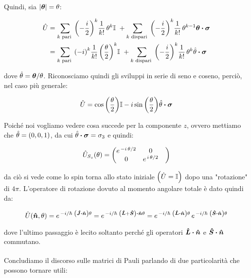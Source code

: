 	Quindi, sia $|\vb*{\theta}| = \theta$:
	
\begin{align*}
	\hat{U} & = \sum_{ k \text{ pari }} \qty(- \frac{i}{2})^k \frac{1}{k!} \, \theta^k \mathbb{I} \,\, + \sum_{k \text{ dispari }} \qty(- \frac{i}{2})^k \frac{1}{k!} \, \theta^{k-1} \vb*{\theta} \vdot \vb*{\sigma} \\
	& = \sum_{ k \text{ pari }} \qty(-i)^k  \frac{1}{k!} \, \qty(\frac{\theta}{2})^k \mathbb{I} \,\, + \sum_{k \text{ dispari }} \qty(- \frac{i}{2})^k \frac{1}{k!} \, \theta^{k} \hat{\theta} \vdot \vb*{\sigma}
\end{align*}
	
	dove $\hat{\theta} = \vb*{\theta}/\theta$. Riconosciamo quindi gli sviluppi in serie di seno e coseno, perciò, nel caso più generale:
	
\begin{align*}
	\hat{U} = \cos\qty(\frac{\theta}{2}) \mathbb{I} - i \sin\qty(\frac{\theta}{2}) \hat{\theta} \vdot \vb*{\sigma}
\end{align*}

	Poiché noi vogliamo vedere cosa succede per la componente $z$, ovvero mettiamo che $\hat{\theta} = \qty(0, 0, 1)$, da cui $\hat{\theta} \vdot \vb*{\sigma} = \sigma_3$ e quindi:
	
\begin{align*}
	\hat{U}_{S_z}\qty(\theta) =\mqty( e^{ \, - i \, \theta/2} & 0 \\ 0 & e^{ \, i \, \theta/2} & )
\end{align*}

	da ciò si vede come lo spin torna allo stato iniziale $\qty(\hat{U} = \mathbb{I})$ dopo una "rotazione" di $4\pi$. L'operatore di rotazione dovuto al momento angolare totale è dato quindi da:
	
\begin{align*}
	\hat{U}\qty(\vb*{\hat{n}}, \theta) = e^{\, - i/\hbar \,\, \qty(\vb*{\hat{J
}} \vdot \vb*{\hat{n}}) \theta} = e^{\, - i/\hbar \,\, \qty(\vb*{\hat{L}} + \vb*{\hat{S}}) \vdot \vb*{\hat{n}}  \theta} =   e^{\, - i/\hbar \,\, \qty(\vb*{\hat{L}} \vdot \vb*{\hat{n}}) \theta} \,  e^{\, - i/\hbar \,\, \qty(\vb*{\hat{S}} \vdot \vb*{\hat{n}} ) \theta}
\end{align*}

	dove l'ultimo passaggio è lecito soltanto perché gli operatori $\vb*{\hat{L}} \vdot \vb*{\hat{n}}$ e $\vb*{\hat{S}} \vdot \vb*{\hat{n}}$ commutano.
	\\
	\\
	Concludiamo il discorso sulle matrici di Pauli parlando di due particolarità che possono tornare utili:
	
